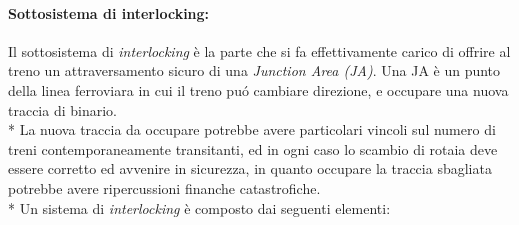 \paragraph{Sottosistema di interlocking:}
Il sottosistema di \emph{interlocking} \`e la parte che si fa effettivamente carico di offrire al treno un attraversamento sicuro di una \emph{Junction Area (JA)}. Una JA \`e un punto della linea ferroviara in cui il treno pu\'o cambiare direzione, e occupare una nuova traccia di binario.\\*
La nuova traccia da occupare potrebbe avere particolari vincoli sul numero di treni contemporaneamente transitanti, ed in ogni caso lo scambio di rotaia deve essere corretto ed avvenire in sicurezza, in quanto occupare la traccia sbagliata potrebbe avere ripercussioni finanche catastrofiche.\\*
Un sistema di \emph{interlocking} \`e composto dai seguenti elementi:
